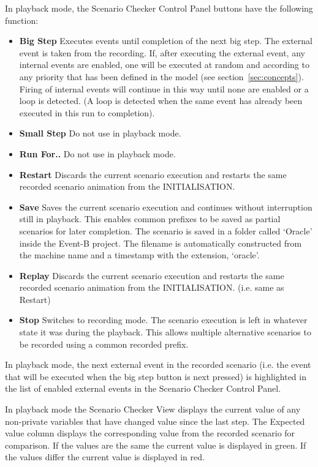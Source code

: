 In playback mode, the Scenario Checker Control Panel buttons have the following function:
\begin{itemize}
	\item \textbf{Big Step}  Executes events until completion of the next big step. The external event is taken from the recording. If, after executing the external event, any internal events are enabled, one will be executed at random and according to any priority that has been defined in the model (see section~\ref{sec:concepts}). Firing of internal events will continue in this way until none are enabled or a loop is detected. (A loop is detected when the same event has already been executed in this run to completion).
	\item \textbf{Small Step}  Do not use in playback mode.
	\item \textbf{Run For..}   Do not use in playback mode.
	\item \textbf{Restart}  Discards the current scenario execution and restarts the same recorded scenario animation from the INITIALISATION. 
	\item \textbf{Save}  Saves the current scenario execution and continues without interruption still in playback. This enables common prefixes to be saved as partial scenarios for later completion. The scenario is saved in a folder called `Oracle' inside the Event-B project. The filename is automatically constructed from the machine name and a timestamp with the extension, `oracle'. 
	\item \textbf{Replay}  Discards the current scenario execution and restarts the same recorded scenario animation from the INITIALISATION. (i.e. same as Restart)
	\item \textbf{Stop}  Switches to recording mode. The scenario execution is left in whatever state it was during the playback. This allows multiple alternative scenarios to be recorded using a common recorded prefix.
\end{itemize}

In playback mode, the next external event in the recorded scenario (i.e. the event that will be executed when the big step button is next pressed) is highlighted in the list of enabled external events in the Scenario Checker Control Panel.

In playback mode the Scenario Checker View displays the current value of any non-private variables that have changed value since the last step.
The Expected value column displays the corresponding value from the recorded scenario for comparison.
If the values are the same the current value is displayed in green. 
If the values differ the current value is displayed in red.

